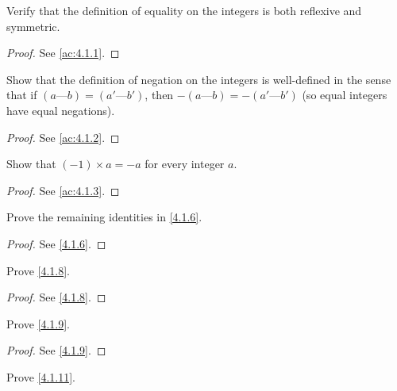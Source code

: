 \exercisesection

\begin{ex}\label{ex:4.1.1}
  Verify that the definition of equality on the integers is both reflexive and symmetric.
\end{ex}

\begin{proof}
  See \cref{ac:4.1.1}.
\end{proof}

\begin{ex}\label{ex:4.1.2}
  Show that the definition of negation on the integers is well-defined in the sense that if \((a \text{---} b) = (a' \text{---} b')\), then \(-(a \text{---} b) = -(a' \text{---} b')\)
  (so equal integers have equal negations).
\end{ex}

\begin{proof}
  See \cref{ac:4.1.2}.
\end{proof}

\begin{ex}\label{ex:4.1.3}
  Show that \((-1) \times a = -a\) for every integer \(a\).
\end{ex}

\begin{proof}
  See \cref{ac:4.1.3}.
\end{proof}

\begin{ex}\label{ex:4.1.4}
  Prove the remaining identities in \cref{4.1.6}.
\end{ex}

\begin{proof}
  See \cref{4.1.6}.
\end{proof}

\begin{ex}\label{ex:4.1.5}
  Prove \cref{4.1.8}.
\end{ex}

\begin{proof}
  See \cref{4.1.8}.
\end{proof}

\begin{ex}\label{ex:4.1.6}
  Prove \cref{4.1.9}.
\end{ex}

\begin{proof}
  See \cref{4.1.9}.
\end{proof}

\begin{ex}\label{ex:4.1.7}
  Prove \cref{4.1.11}.
\end{ex}

